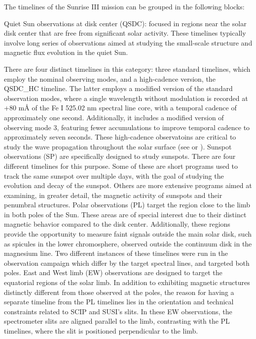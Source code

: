 The timelines of the Sunrise III mission can be grouped in the following blocks: 

\begin{itemize}
  \Myitem Quiet Sun observations at disk center (QSDC): focused in regions near the solar disk center that are free from significant solar activity. These timelines typically involve long series of observations aimed at studying the small-scale structure and magnetic flux evolution in the quiet Sun. 
  
  There are four distinct timelines in this category: three standard timelines, which employ the nominal observing modes, and a high-cadence version, the QSDC{\_}HC timeline. The latter employs a modified version of the standard observation modes, where a single wavelength without modulation is recorded at +80 m\r{A} of the Fe I 525.02 nm spectral line core, with a temporal cadence of approximately one second. Additionally, it includes a modified version of observing mode 3, featuring fewer accumulations to improve temporal cadence to approximately seven seconds. These high-cadence observatoins are critical to study the wave propagation throughout the solar surface (see \citealt{acoustic-waves} or \citealt{acoustic-waves-2}).    
  \Myitem Sunspot observations (SP) are specifically designed to study sunspots. There are four different timelines for this purpose. Some of these are short programs used to track the same sunspot over multiple days, with the goal of studying the evolution and decay of the sunspot. Others are more extensive programs aimed at examining, in greater detail, the magnetic activity of sunspots and their penumbral structures.
  \Myitem Polar observations (PL) target the region close to the limb in both poles of the Sun. These areas are of special interest due to their distinct magnetic behavior compared to the disk center. Additionally, these regions provide the opportunity to measure faint signals outside the main solar disk, such as spicules in the lower chromosphere, observed outside the continuum disk in the magnesium line. Two different instances of these timelines were run in the observation campaign which differ by the target spectral lines, and targeted both poles. 
  \Myitem East and West limb (EW) observations are designed to target the equatorial regions of the solar limb. In addition to exhibiting magnetic structures distinctly different from those observed at the poles, the reason for having a separate timeline from the PL timelines lies in the orientation and technical constraints related to SCIP and SUSI's slits. In these EW observations, the spectrometer slits are aligned parallel to the limb, contrasting with the PL timelines, where the slit is positioned perpendicular to the limb.

\end{itemize}
